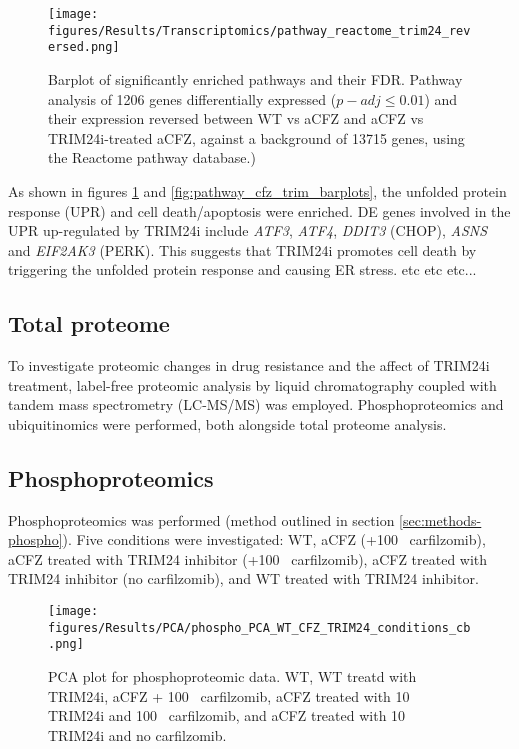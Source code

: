 \begin{figure}[hbt]
\centering
\texttt{[image: figures/Results/Transcriptomics/pathway\_reactome\_trim24\_reversed.png]}
\caption[Enriched pathways- TRIM24i reversed genes]{Barplot of significantly enriched pathways and their FDR.
Pathway analysis of 1206 genes differentially expressed ($p-adj\leq0.01$) and their expression reversed between WT vs aCFZ and aCFZ vs TRIM24i-treated aCFZ, against a background of 13715 genes, using the Reactome pathway database.)}
\label{fig:trim24_reversed_pahtway_barplot_reactome}
\end{figure}

As shown in figures \ref{fig:trim24_reversed_pahtway_barplot_reactome} and \ref{fig:pathway_cfz_trim_barplots}, the unfolded protein response (UPR) and cell death/apoptosis were enriched.
DE genes involved in the UPR up-regulated by TRIM24i include \textit{ATF3}, \textit{ATF4}, \textit{DDIT3} (CHOP), \textit{ASNS} and \textit{EIF2AK3} (PERK).
This suggests that TRIM24i promotes cell death by triggering the unfolded protein response and causing ER stress.
etc etc etc... 

\subsection{Total proteome}\label{subsec:omics-proteome}
To investigate proteomic changes in drug resistance and the affect of TRIM24i treatment, label-free proteomic analysis by liquid chromatography coupled with tandem mass spectrometry (LC-MS/MS) was employed.
Phosphoproteomics and ubiquitinomics were performed, both alongside total proteome analysis.



\subsection{Phosphoproteomics}\label{subsec:omics-phospho}
Phosphoproteomics was performed (method outlined in section \ref{sec:methods-phospho}).
Five conditions were investigated: WT, aCFZ (+100\si{\nano\Molar} carfilzomib), aCFZ treated with TRIM24 inhibitor (+100\si{\nano\Molar} carfilzomib), aCFZ treated with TRIM24 inhibitor (no carfilzomib), and WT treated with TRIM24 inhibitor.

\begin{figure}[htb]
\centering
\texttt{[image: figures/Results/PCA/phospho\_PCA\_WT\_CFZ\_TRIM24\_conditions\_cb.png]}
\caption[Phosphoproteomics PCA]{PCA plot for phosphoproteomic data.
WT, WT treatd with TRIM24i, aCFZ + 100\si{\nano\Molar} carfilzomib, aCFZ treated with 10\si{\mu\Molar} TRIM24i and 100\si{\nano\Molar} carfilzomib, and aCFZ treated with 10\si{\micro\Molar} TRIM24i and no carfilzomib.}
\label{fig:phospho_PCA}
\end{figure}

